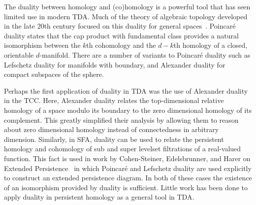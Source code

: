 The duality between homology and (co)homology is a powerful tool that has seen limited use in modern TDA.
Much of the theory of algebraic topology developed in the late 20th century focused on this duality for general spaces~\cite{spanier66algebraic,munkres84elements,bredon93,hatcher01}.
Poincar\'e duality states that the cap product with fundamental class provides a natural isomorphism between the $k$th cohomology and the $d-k$th homology of a closed, orientable $d$-manifold.
There are a number of variants to Poincar\'e duality such as Lefschetz duality for manifolds with boundary, and Alexander duality for compact subspaces of the sphere.

Perhaps the first application of duality in TDA was the use of Alexander duality in the TCC.
Here, Alexander duality relates the top-dimensional relative homology of a space modulo its boundary to the zero dimensional homology of its complement.
This greatly simplified their analysis by allowing them to reason about zero dimensional homology instead of connectedness in arbitrary dimension.
Similarly, in SFA, duality can be used to relate the persistent homology and cohomology of sub and super levelset filtrations of a real-valued function.
This fact is used  in work by Cohen-Steiner, Edelsbrunner, and Harer on Extended Persistence~\cite{cohen09extending} in which Poincar\'e and Lefschetz duality are used explicitly to construct an extended persistence diagram.
In both of these cases the existence of an isomorphism provided by duality is sufficient.
Little work has been done to apply duality in persistent homology as a general tool in TDA.

